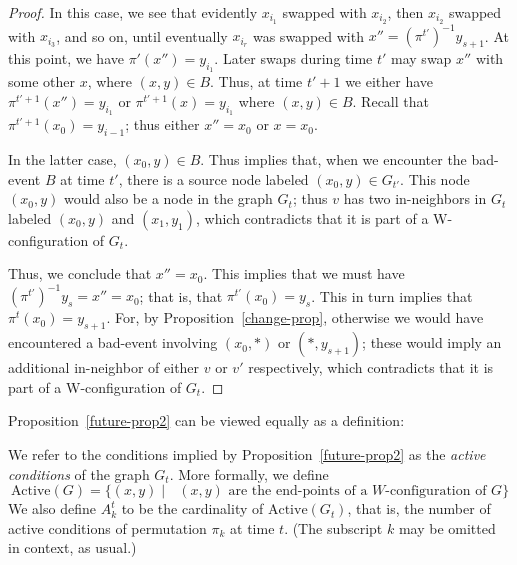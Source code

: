 \begin{proof}
In this case, we see that evidently $x_{i_1}$ swapped with $x_{i_2}$, then $x_{i_2}$ swapped with $x_{i_3}$, and so on, until eventually $x_{i_r}$ was swapped with $x'' = (\pi^{t'})^{-1} y_{s+1}$. At this point, we have $\pi' ( x''  ) = y_{i_1}$. Later swaps during time $t'$ may swap $x''$ with some other $x$, where $(x,y) \in B$. Thus, at time $t'+1$ we either have $\pi^{t'+1}(x'') = y_{i_1}$ or $\pi^{t'+1}(x) = y_{i_1}$ where $(x,y) \in B$. Recall that $\pi^{t'+1}(x_0) = y_{i-1}$; thus either $x'' = x_0$ or $x = x_0$. 

In the latter case, $(x_0, y) \in B$. Thus implies that, when we encounter the bad-event $B$ at time $t'$, there is a source node labeled $(x_0, y) \in G_{t'}$. This node $(x_0, y)$ would also be a node in the graph $G_t$; thus $v$ has two in-neighbors in $G_t$ labeled $(x_0, y)$ and $(x_1, y_1)$, which contradicts that it is part of a W-configuration of $G_t$.

Thus, we conclude that $x'' = x_0$. This implies that we must have $(\pi^{t'})^{-1} y_s = x'' = x_0$; that is, that $\pi^{t'}(x_0) = y_s$. This in turn implies that  $\pi^t(x_0) = y_{s+1}$. For, by Proposition~\ref{change-prop}, otherwise we would have encountered a bad-event involving $(x_0, *)$ or $(*, y_{s+1})$; these would imply an additional in-neighbor of either $v$ or $v'$ respectively, which contradicts that it is part of a W-configuration of $G_t$.
\end{proof}

Proposition~\ref{future-prop2} can be viewed equally as a definition:
\begin{definition}
We refer to the conditions implied by Proposition~\ref{future-prop2} as the \emph{active conditions} of the graph $G_t$. More formally, we define
$$
\text{Active}(G) = \{ (x, y)  \mid \text{ $(x,y)$ are the end-points of a $W$-configuration of $G$} \}
$$
We also define $A^{t}_k$ to be the cardinality of $\text{Active}(G_t)$, that is, the number of active conditions of permutation $\pi_k$ at time $t$. (The subscript $k$ may be omitted in context, as usual.)
\end{definition}

